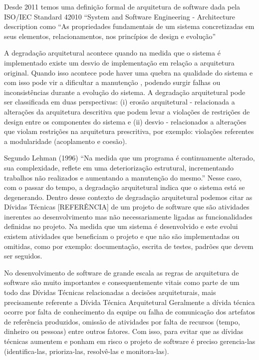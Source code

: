 \documentclass[
	12pt,				%
	openright,			%
	twoside,			%
	a4paper,			%
	english,			%
	french,				%
	spanish,			%
	brazil,				%
	]{abntex2}
\begin{document}
Desde 2011 temos uma definição formal de arquitetura de software dada
pela ISO/IEC Standard 42010 \textquotedblleft System and Software
Engineering - Architecture description\textquotedbl{} como \textquotedblleft As
propriedades fundamentais de um sistema concretizadas em seus elementos,
relacionamentos, nos princípios de design e evolução\textquotedblright {} 

A degradação arquitetural acontece quando na medida que o sistema
é implementado existe um desvio de implementação em relação a arquitetura original. Quando isso acontece pode haver uma quebra
na qualidade do sistema e com isso pode vir a dificultar a manutenção
, podendo surgir falhas ou inconsistências durante a evolução
do sistema. A degradação arquitetural pode ser classificada em duas
perspectivas: (i) erosão arquitetural - relacionada a alterações da
arquitetura descritiva que podem levar a violações de restrições de
design entre os componentes do sistema e (ii) desvio - relacionados
a alterações que violam restrições na arquitetura prescritiva, por
exemplo: violações referentes a modularidade (acoplamento e coesão). 

Segundo Lehman (1996) \textquotedblleft Na medida que um programa
é continuamente alterado, sua complexidade, reflete em uma deteriorização
estrutural, incrementando trabalhos não realizados e aumentando a
manutenção do mesmo.\textquotedblright{} Nesse caso, com o passar do tempo, a degradação arquitetural indica que o sistema está
se degenerando. Dentro desse contexto de degradação
arquitetural podemos citar as Dívidas Técnicas [REFERÊNCIA] de um projeto de software
que são atividades inerentes ao desenvolvimento mas não necessariamente
ligadas as funcionalidades definidas no projeto. Na medida que um
sistema é desenvolvido e este evolui existem atividades que beneficiam
o projeto e que não são implementadas ou omitidas, como por exemplo:
documentação, escrita de testes, padrões que devem ser seguidos. 

No desenvolvimento de software de grande escala as regras de arquitetura
de software são muito importantes e consequentemente vitais como parte
de um todo das Dívidas Técnicas relacionadas a decisões arquiteturais,
mais precisamente referente a Dívida Técnica Arquitetural
Geralmente a dívida técnica ocorre por falta de conhecimento da equipe
ou falha de comunicação dos artefatos de referência produzidos, omissão
de atividades por falta de recursos (tempo, dinheiro ou pessoas) entre
outros fatores. Com isso, para evitar que as dívidas técnicas aumentem
e ponham em risco o projeto de software é preciso gerencia-las (identifica-las,
prioriza-las, resolvê-las e monitora-las). 
\end{document}
